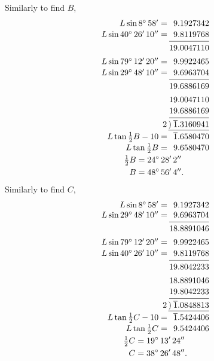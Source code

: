 \documentclass{book}[2004/02/16]
\begin{document}
\begin{mainmatter}
\begin{spacing}{1.3}
Similarly to find $B$,
\[
\begin{array}{r@{\:}r}
L \sin 8^\circ\, 58' = & \phantom{1} 9.1927342\\[.3ex]
L \sin 40^\circ\, 26'\, 10'' = & \phantom{1} 9.8119768\\[-1.5ex]
&\hrulefill\\[-.3ex]
&19.0047110\\[1ex]
L \sin 79^\circ\, 12'\, 20'' = & \phantom{1} 9.9922465\\[.3ex]
L \sin 29^\circ\, 48'\, 10'' = & \phantom{1} 9.6963704\\[-1.5ex]
&\hrulefill\\[-.3ex]
&19.6886169\\[1ex]
&19.0047110\\[.3ex]
&19.6886169\\[-1.5ex]
&\hrulefill\\[-.3ex]
\multicolumn{2}{r}{ 2\,\underline{)\: \overline{1}.3160941}}\\[.6ex]
L \tan \tfrac{1}{2}B - 10 = & \phantom{1} \overline{1}.6580470\\[.3ex]
L \tan \tfrac{1}{2}B = & \phantom{1} 9.6580470\\[.6ex]
\multispan{2}{\hfil$\begin{aligned}
\tfrac{1}{2}B &= 24^\circ\, 28'\, 2''\\
B &= 48^\circ\, 56'\, 4''.
\end{aligned}$\hfil}
\end{array}
\]
Similarly to find $C$,
\[
\begin{array}{r@{\:}r}
L \sin 8^\circ\, 58' = & \phantom{1} 9.1927342\\
L \sin 29^\circ\, 48'\, 10'' = & \phantom{1} 9.6963704\\[-1.5ex]
&\hrulefill\\[-.3ex]
&18.8891046\\[1ex]
L \sin 79^\circ\, 12'\, 20'' = & \phantom{1} 9.9922465\\[.3ex]
L \sin 40^\circ\, 26'\, 10'' = & \phantom{1} 9.8119768\\[-1.5ex]
&\hrulefill\\[-.3ex]
&19.8042233\\[1ex]
&18.8891046\\[.3ex]
&19.8042233\\[-1.5ex]
&\hrulefill\\[-.3ex]
\multicolumn{2}{r}{ 2\,\underline{)\: \overline{1}.0848813}} \\[.6ex]
L \tan \tfrac{1}{2}C-10 = & \phantom{1} \overline{1}.5424406\\[.3ex]
L \tan \tfrac{1}{2}C = & \phantom{1} 9.5424406\\[.6ex]
\multispan{2}
{\hfil$\begin{aligned}
\tfrac{1}{2}C &= 19^\circ\, 13'\, 24''\\
C &= 38^\circ\, 26'\, 48''.
\end{aligned}$\hfil}
\end{array}
\]


\end{spacing}
\end{mainmatter}
\end{document}
